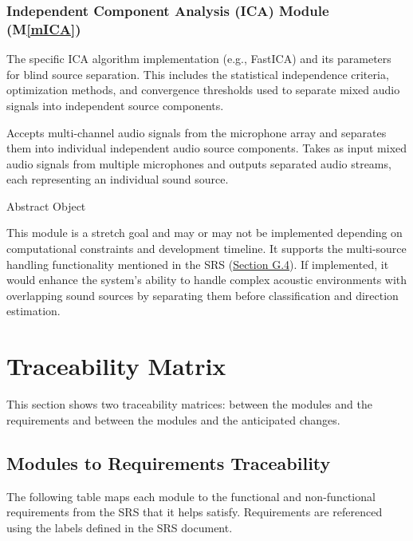 \documentclass[12pt, titlepage]{article}
\newcommand{\mref}[1]{M\ref{#1}}
\begin{document}
\subsubsection{Independent Component Analysis (ICA) Module (\mref{mICA})}
\begin{description}[labelindent=0.5cm]
  \item[Secrets:] The specific ICA algorithm implementation (e.g., FastICA) and
  its parameters for blind source separation. This includes the statistical
  independence criteria, optimization methods, and convergence thresholds used
  to separate mixed audio signals into independent source components.
  \item[Services:] Accepts multi-channel audio signals from the microphone array
  and separates them into individual independent audio source components. Takes
  as input mixed audio signals from multiple microphones and outputs separated
  audio streams, each representing an individual sound source.
  \item[Implemented By:] \progname
  \item[Type of Module] Abstract Object
  \item[Notes:] This module is a stretch goal and may or may not be implemented
  depending on computational constraints and development timeline. It supports
  the multi-source handling functionality mentioned in the SRS
  (\hyperref[SRS-sec:g4]{Section G.4}). If implemented, it would enhance the
  system's ability to handle complex acoustic environments with overlapping
  sound sources by separating them before classification and direction
  estimation.
\end{description}

\section{Traceability Matrix} \label{SecTM}

This section shows two traceability matrices: between the modules and the
requirements and between the modules and the anticipated changes.

\subsection{Modules to Requirements Traceability}

The following table maps each module to the functional and non-functional
requirements from the SRS that it helps satisfy. Requirements are referenced
using the labels defined in the SRS document.
\end{document}
